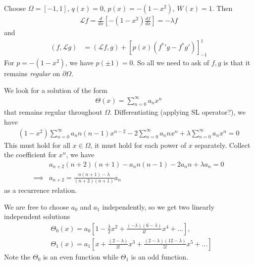 \documentclass[a4paper]{article}
\begin{document}
\begin{eg}
Choose $\Omega = \left[-1,1\right]$, $q\left(x\right) = 0$, $p\left(x\right) = -\left(1-x^2\right)$, $W\left(x\right) = 1$. Then
\begin{equation*}
\begin{aligned}
\mathcal{L} f = \frac{d}{dx} \left[-\left(1-x^2\right) \frac{df}{dx}\right] = -\lambda f
\end{aligned}
\end{equation*}
and
\begin{equation*}
\begin{aligned}
\left(f,\mathcal{L} g\right) &= \left(\mathcal{L}f,g\right) + \left[p\left(x\right)\left(\left.f^*\right.' g - f^* g'\right)\right]_{-1}^1
\end{aligned}
\end{equation*}
For $p = -\left(1-x^2\right)$, we have $p\left(\pm 1\right) = 0$. So all we need to ask of $f,g$ is that it remains \emph{regular} on $\partial \Omega$.

We look for a solution of the form
\begin{equation*}
\begin{aligned}
\Theta\left(x\right) = \sum_{n=0}^\infty a_n x^n
\end{aligned}
\end{equation*}
that remains regular throughout $\Omega$. Differentiating (applying SL operator?), we have
\begin{equation*}
\begin{aligned}
\left(1-x^2\right)\sum_{n=0}^\infty a_n n\left(n-1\right) x^{n-2} - 2\sum_{n=0}^\infty a_n nx^n + \lambda \sum_{n=0}^\infty a_n x^n = 0
\end{aligned}
\end{equation*}
This must hold for all $x \in \Omega$, it must hold for each power of $x$ separately. Collect the coefficient for $x^n$, we have
\begin{equation*}
\begin{aligned}
&a_{n+2}\left(n+2\right)\left(n+1\right) -a_n n \left(n-1\right) - 2a_n n + \lambda a_n = 0\\
\implies &a_{n+2} = \frac{n\left(n+1\right) - \lambda}{\left(n+2\right)\left(n+1\right)} a_n
\end{aligned}
\end{equation*}
as a recurrence relation.

We are free to choose $a_0$ and $a_1$ independently, so we get two linearly independent solutions
\begin{equation*}
\begin{aligned}
&\Theta_0\left(x\right) = a_0\left[1- \frac{\lambda}{2}x^2 + \frac{\left(-\lambda\right)\left(6-\lambda\right)}{4!}x^4 + ...\right],\\
&\Theta_1\left(x\right) = a_1\left[x+\frac{\left(2-\lambda\right)}{3!}x^3 + \frac{\left(2-\lambda\right)\left(12-\lambda\right)}{5!} x^5 + ...\right]
\end{aligned}
\end{equation*}
Note the $\Theta_0$ is an even function while $\Theta_1$ is an odd function.


\end{eg}
\end{document}
